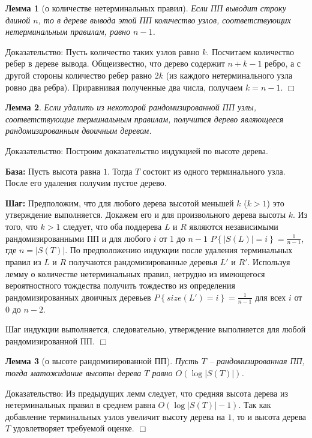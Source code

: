 \documentclass[14pt]{article}
\newtheorem{lemma}{Лемма}[section]
\begin{document}
\begin{lemma}[о количестве нетерминальных правил]
	Если ПП выводит строку длиной $n$, то в дереве вывода этой ПП количество
	узлов, соответствующих нетерминальным правилам, равно $n - 1$.
\end{lemma}

{\sc Доказательство:} Пусть количество таких узлов равно $k$. Посчитаем
количество ребер в дереве вывода. Общеизвестно, что дерево содержит $n + k - 1$ ребро,
а с другой стороны количество ребер равно $2k$ (из каждого нетерминального узла ровно два ребра).
Приравнивая полученные два числа, получаем $k = n - 1$. $\Box$

\begin{lemma}
	Если удалить из некоторой рандомизированной ПП узлы, соответствующие терминальным правилам, получится дерево
	являющееся рандомизированным двоичным деревом.
\end{lemma}

{\sc Доказательство:} Построим доказательство индукцией по высоте дерева.

{\bf База:} Пусть высота равна $1$. Тогда $T$ состоит из одного терминального узла. После его удаления получим пустое дерево.

{\bf Шаг:} Предположим, что для любого дерева высотой меньшей $k$ ($k > 1$) это утверждение выполняется. Докажем его и для произвольного дерева высоты $k$.
Из того, что $k > 1$ следует, что оба поддерева $L$ и $R$ являются независимыми рандомизированными ПП и для любого $i$ от 1 до $n-1$ 
$P\left\{\left|S(L)\right| = i\right\} = \frac{1}{n-1}$, где $n = \left|S(T)\right|$. По предположению индукции после
удаления терминальных правил из $L$ и $R$ получаются рандомизированные деревья $L'$ и $R'$.
Используя лемму о количестве нетерминальных правил, нетрудно из имеющегося вероятностного тождества получить тождество из
определения рандомизированных двоичных деревьев $P\left\{size(L') = i\right\} = \frac{1}{n-1}$ для всех $i$ от 0 до $n-2$.

Шаг индукции выполняется, следовательно, утверждение выполняется для любой рандомизированной ПП. $\Box$

\begin{lemma}[о высоте рандомизированной ПП]
	Пусть $T$ -- рандомизированная ПП, тогда матожидание высоты дерева $T$ равно $O(\log |S(T)|)$.
\end{lemma}

{\sc Доказательство:} Из предыдущих лемм следует, что средняя высота дерева из нетерминальных правил в среднем равна $O(\log{|S(T)| - 1})$.
Так как добавление терминальных узлов увеличит высоту дерева на $1$, то и высота дерева $T$ удовлетворяет требуемой оценке. $\Box$
\end{document}
